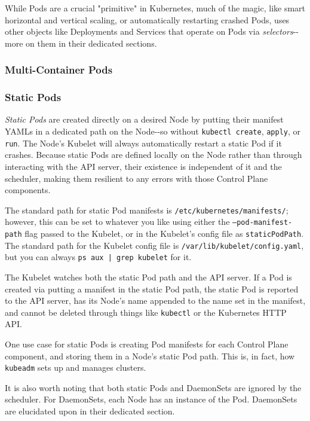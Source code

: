 \documentclass[11pt, a4paper]{article}
\begin{document}
While Pods are a crucial "primitive" in Kubernetes, much of the magic, like smart horizontal and vertical scaling, or automatically restarting crashed Pods, uses other objects like Deployments and Services that operate on Pods via \textit{selectors}{-}{-}more on them in their dedicated sections.  

\subsubsection{Multi-Container Pods}

\subsubsection{Static Pods}

\textit{Static Pods} are created directly on a desired Node by putting their manifest YAMLs in a dedicated path on the Node{-}{-}so without \texttt{kubectl create}, \texttt{apply}, or \texttt{run}. The Node's Kubelet will always automatically restart a static Pod if it crashes. Because static Pods are defined locally on the Node rather than through interacting with the API server, their existence is independent of it and the scheduler, making them resilient to any errors with those Control Plane components.

The standard path for static Pod manifests is \texttt{/etc/kubernetes/manifests/}; however, this can be set to whatever you like using either the \texttt{--pod-manifest-path} flag passed to the Kubelet, or in the Kubelet's config file as \texttt{staticPodPath}. The standard path for the Kubelet config file is \texttt{/var/lib/kubelet/config.yaml}, but you can always \texttt{ps aux | grep kubelet} for it. 

The Kubelet watches both the static Pod path and the API server. If a Pod is created via putting a manifest in the static Pod path, the static Pod is reported to the API server, has its Node's name appended to the name set in the manifest, and cannot be deleted through things like \texttt{kubectl} or the Kubernetes HTTP API.

One use case for static Pods is creating Pod manifests for each Control Plane component, and storing them in a Node's static Pod path. This is, in fact, how \texttt{kubeadm} sets up and manages clusters.

It is also worth noting that both static Pods and DaemonSets are ignored by the scheduler. For DaemonSets, each Node has an instance of the Pod. DaemonSets are elucidated upon in their dedicated section. 
\end{document}
